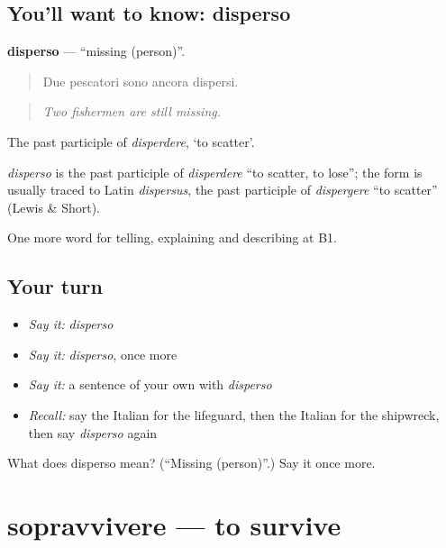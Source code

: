 \subsection*{You'll want to know: disperso}
\textbf{disperso} — \textquotedblleft{}missing (person)\textquotedblright{}.

\begin{quote}
Due pescatori sono ancora dispersi.
\end{quote}

\begin{quote}
\emph{Two fishermen are still missing.}
\end{quote}

The past participle of \emph{disperdere}, ‘to scatter’.

\begin{cousinweb}
\emph{disperso} is the past participle of \emph{disperdere} \textquotedblleft{}to scatter, to lose\textquotedblright{}; the form is usually traced to Latin \emph{dispersus}, the past participle of \emph{dispergere} \textquotedblleft{}to scatter\textquotedblright{} (Lewis \& Short).
\end{cousinweb}

\begin{grammarlens}[title={What you've built}]
One more word for telling, explaining and describing at B1.
\end{grammarlens}

\subsection*{Your turn}
\begin{itemize}
\raggedright
  \item \emph{Say it:} \emph{disperso}
  \item \emph{Say it:} \emph{disperso}, once more
  \item \emph{Say it:} a sentence of your own with \emph{disperso}
  \item \emph{Recall:} say the Italian for the lifeguard, then the Italian for the shipwreck, then say \emph{disperso} again
\end{itemize}

\begin{tcolorbox}[breakable,colback=teal!4,colframe=teal!35!black,title={Before you move on}]
What does disperso mean? (\textquotedblleft{}Missing (person)\textquotedblright{}.) Say it once more.
\end{tcolorbox}
\section[sopravvivere]{sopravvivere — to survive}

